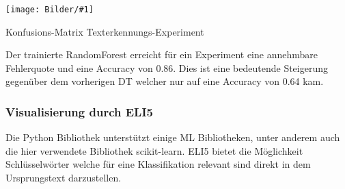 \documentclass[
  12pt, %
  a4paper, %
  oneside, %
  openany, 
  numbers=noenddot, %
  BCOR=5mm, %
  parskip=half*, %
  thesis, %
]{bfhbook}
\newcommand{\imgText}[3]{
\begin{center}
    \begin{minipage}[t]{0.6\textwidth}
    		\vspace{0pt}
		\texttt{[image: Bilder/\#1]}
		\caption{#2}
	\end{minipage}\hfill
    \begin{minipage}[t]{0.4\textwidth}
    		\vspace{5pt}
  		#3
    \end{minipage}
\end{center}
}
\begin{document}
\imgText{MovieReviews-SentimentClassification_ConfMatrix.PNG}{Konfusions-Matrix Texterkennungs-Experiment}{
Der trainierte RandomForest erreicht für ein Experiment eine annehmbare Fehlerquote und eine Accuracy von 0.86. Dies ist eine bedeutende Steigerung gegenüber dem vorherigen \Gls{DT} welcher nur auf eine Accuracy von 0.64  kam.
}

\subsubsection*{Visualisierung durch ELI5}
Die Python Bibliothek \cite{ELI5} unterstützt einige \gls{ML} Bibliotheken, unter anderem auch die hier verwendete Bibliothek scikit-learn. ELI5 bietet die Möglichkeit Schlüsselwörter welche für eine Klassifikation relevant sind direkt in dem Ursprungstext darzustellen. 
\end{document}

